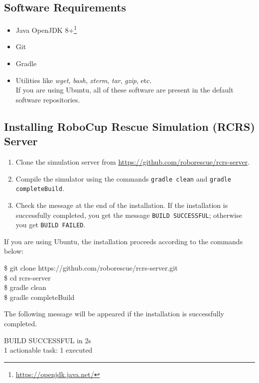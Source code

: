 \documentclass{article}
\begin{document}
\subsection{Software Requirements}
\begin{itemize}
  \item Java OpenJDK 8+\footnote{\url{https://openjdk.java.net/}}
  \item Git
  \item Gradle
  \item Utilities like \emph{wget}, \emph{bash}, \emph{xterm}, \emph{tar}, \emph{gzip}, etc.\\
        If you are using Ubuntu, all of these software are present in the
        default software repositories.
\end{itemize}
\subsection{Installing RoboCup Rescue Simulation (RCRS) Server}
\begin{enumerate}
 \item Clone the simulation server from \url{https://github.com/roborescue/rcrs-server}.
 \item Compile the simulator using the commands \texttt{gradle clean} and \texttt{gradle completeBuild}.
 \item Check the message at the end of the installation.
       If the installation is successfully completed, you get the message \texttt{BUILD SUCCESSFUL}; otherwise you get \texttt{BUILD FAILED}.
\end{enumerate}

If you are using Ubuntu, the installation proceeds according to the commands below:

\begin{center}
  \begin{tcolorbox}[title=Installation on Ubuntu, width=.98\linewidth]
  {\ttfamily\small
  \$ git clone https://github.com/roborescue/rcrs-server.git\\
  \$ cd rcrs-server\\
  \$ gradle clean\\
  \$ gradle completeBuild
  }
  \end{tcolorbox}
\end{center}

The following message will be appeared if the installation is successfully completed.

\begin{center}
  \begin{tcolorbox}[title=Install Completion, width=.98\linewidth]
  {\ttfamily
  BUILD SUCCESSFUL in 2s\\
  1 actionable task: 1 executed
  }
  \end{tcolorbox}
\end{center}
\end{document}
